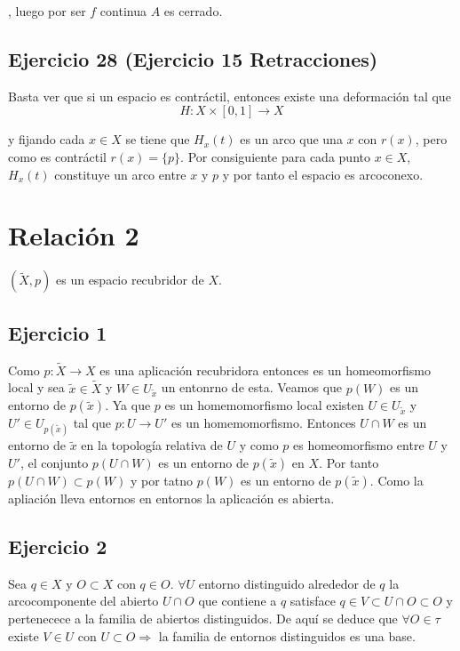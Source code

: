 \documentclass{article}
\begin{document}
, luego por ser $f$ continua $A$ es cerrado.

\subsection{Ejercicio 28 (Ejercicio 15 Retracciones)}
Basta ver que si un espacio es contráctil, entonces existe una deformación tal que
\begin{equation*}
H:X\times [0,1]\rightarrow X
\end{equation*}

y fijando cada $x\in X$ se tiene que $H_x(t)$ es un arco que una $x$ con $r(x)$, pero como es contráctil $r(x)=\{p\}$. Por consiguiente para cada punto $x\in X$, $H_x(t)$ constituye un arco entre $x$ y $p$ y por tanto el espacio es arcoconexo.

\section{Relación 2}
$(\tilde{X},p)$ es un espacio recubridor de $X$.

\subsection{Ejercicio 1}
Como $p:\tilde{X}\rightarrow X$ es una aplicación recubridora entonces es un homeomorfismo local y sea $\tilde{x}\in \tilde{X}$ y $W \in U_{\tilde{x}}$ un entonrno de esta. Veamos que $p(W)$ es un entorno de $p(\tilde{x})$. Ya que $p$ es un homemomorfismo local existen $U\in U_{\tilde{x}}$ y $U'\in U_{p(\tilde{x})}$ tal que $p:U\rightarrow U'$ es un homemomorfismo. Entonces $U\cap W$ es un entorno de $\tilde{x}$ en la topología relativa de $U$ y como $p$ es homeomorfismo entre $U$ y $U'$, el conjunto  $p(U\cap W)$ es un entorno de $p(\tilde{x})$ en $X$. Por tanto $p(U\cap W)\subset p(W)$ y por tatno $p(W)$ es un entorno de $p(\tilde{x})$. Como la apliación lleva entornos en entornos la aplicación es abierta.

\subsection{Ejercicio 2}
Sea $q\in X$ y $O\subset X$ con $q\in O$. $\forall U$ entorno distinguido alrededor de $q$ la arcocomponente del abierto $U\cap O$ que contiene a $q$ satisface $q\in V\subset U\cap O\subset O$ y pertenecece a la familia de abiertos distinguidos. De aquí se deduce que $\forall O\in \tau$ existe $V\in U$ con $U\subset O\Rightarrow $ la familia de entornos distinguidos es una base.
\end{document}

